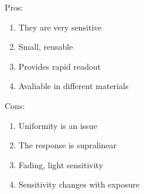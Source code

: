 Pros:

\begin{enumerate}
    \item 
    They are very sensitive
    \item
    Small, reusable
    \item
    Provides rapid readout
    \item
    Avaliable in different materials
    
\end{enumerate}

Cons:

\begin{enumerate}
    \item
    Uniformity is an issue
    \item
    The response is supralinear
    \item
    Fading, light sensitivity
    \item
    Sensitivity changes with exposure
\end{enumerate}


